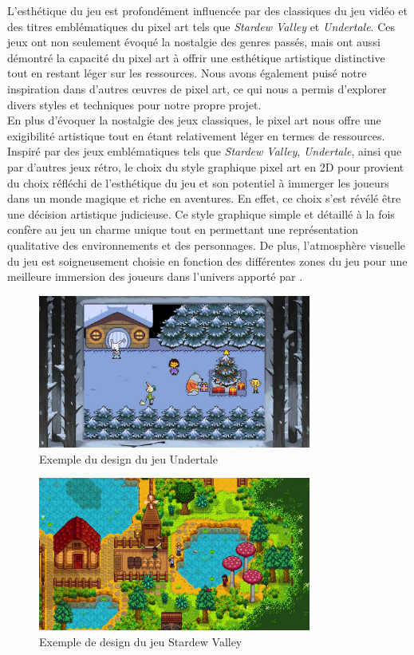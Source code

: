 L'esthétique du jeu \gameName est profondément influencée par des classiques du jeu vidéo et des titres emblématiques du pixel art tels que \textit{Stardew Valley} 
et \textit{Undertale}.
Ces jeux ont non seulement évoqué la nostalgie des genres passés, mais ont aussi démontré la capacité du pixel art à offrir une esthétique artistique distinctive 
tout en restant léger sur les ressources.
Nous avons également puisé notre inspiration dans d'autres œuvres de pixel art, ce qui nous a permis d'explorer divers styles et techniques pour notre propre projet.
\\

En plus d'évoquer la nostalgie des jeux classiques, le pixel art nous offre une exigibilité artistique tout en étant relativement léger en termes de ressources.
Inspiré par des jeux emblématiques tels que \textit{Stardew Valley}, \textit{Undertale}, ainsi que par d'autres jeux rétro, le choix du style graphique pixel art en 2D pour 
\gameName provient du choix réfléchi de l'esthétique du jeu et son potentiel à immerger les joueurs dans un monde magique et riche en aventures.
En effet, ce choix s'est révélé être une décision artistique judicieuse.
Ce style graphique simple et détaillé à la fois confère au jeu un charme unique tout en permettant une représentation qualitative des environnements et des personnages.
De plus, l'atmosphère visuelle du jeu est soigneusement choisie en fonction des différentes zones du jeu pour une meilleure immersion des joueurs dans l'univers apporté par 
\gameName.
\begin{figure}[H]
      \centering
      \includegraphics[width=0.8\textwidth]{assets/undertale.png}
      \caption{Exemple du design du jeu Undertale}
      \label{fig:website1}
  \end{figure}
\begin{figure}[H]
      \centering
      \includegraphics[width=0.8\textwidth]{assets/stardueley.png}
      \caption{Exemple de design du jeu Stardew Valley}
      \label{fig:website1}
  \end{figure}
